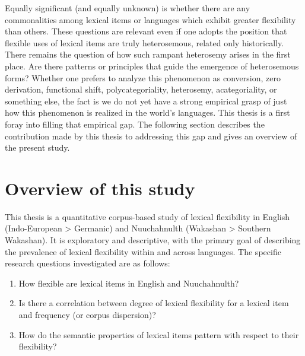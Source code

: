 \noindent Equally significant (and equally unknown) is whether there are any commonalities among lexical items or languages which exhibit greater flexibility than others. These questions are relevant even if one adopts the position that flexible uses of lexical items are truly heterosemous, related only historically. There remains the question of how such rampant heterosemy arises in the first place. Are there patterns or principles that guide the emergence of heterosemous forms? Whether one prefers to analyze this phenomenon as conversion, zero derivation, functional shift, polycategoriality, heterosemy, acategoriality, or something else, the fact is we do not yet have a strong empirical grasp of just how this phenomenon is realized in the world's languages. This thesis is a first foray into filling that empirical gap. The following section describes the contribution made by this thesis to addressing this gap and gives an overview of the present study.

\section{Overview of this study}
\label{sec:1.3}

This thesis is a quantitative corpus-based study of lexical flexibility in English (Indo-European > Germanic) and Nuuchahnulth (Wakashan > Southern Wakashan). It is exploratory and descriptive, with the primary goal of describing the prevalence of lexical flexibility within and across languages. The specific research questions investigated are as follows:

\begin{enumerate}[
  label      = {\textbf{R\arabic*:}},
  leftmargin = *,
  ref        = {R\arabic*}
]
  \item\label{R1} How flexible are lexical items in English and Nuuchahnulth?
  \item\label{R2} Is there a correlation between degree of lexical flexibility for a lexical item and frequency (or corpus dispersion)?
  \item\label{R3} How do the semantic properties of lexical items pattern with respect to their flexibility?
\end{enumerate}

